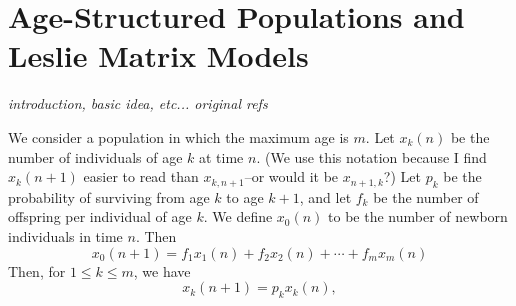 \section{Age-Structured Populations and Leslie Matrix Models}
\emph{introduction, basic idea, etc...
original refs\cite{Leslie45,Leslie48}}

We consider a population in which the maximum
age is $m$.
Let $x_{k}(n)$ be the number of individuals
of age $k$ at time $n$.
(We use this notation because
I find $x_{k}(n+1)$
easier to read than $x_{k,n+1}$--or would it be $x_{n+1,k}$?)
Let
$p_k$ be the probability of surviving from age $k$
to age $k+1$,
and let $f_k$ be the number of offspring per individual
of age $k$.
We define $x_0(n)$ to be the number of newborn individuals
in time $n$.
Then
\begin{equation}
  x_{0}(n+1) = f_1 x_{1}(n) + f_2 x_{2}(n) + \cdots + f_m x_{m}(n)
\label{eqn:leslie:newborn}
\end{equation}
Then, for $1 \le k \le m$, we have
\begin{equation}
   x_{k}(n+1) = p_k x_{k}(n),
\label{eqn:leslie:nextgen}
\end{equation}

